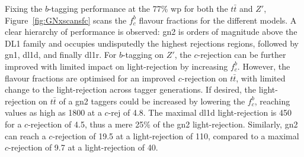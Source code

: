 Fixing the $b$-tagging performance at the 77\% \gls{wp} for both the $t\bar{t}$ and $Z'$, Figure~\ref{fig:GNxscansfc} scans the $f^b_c$ flavour fractions for the different models. A clear hierarchy of performance is observed: \gls{gn2} is orders of magnitude above the DL1 family and occupies undisputedly the highest rejections regions, followed by \gls{gn1}, \gls{dl1d}, and finally \gls{dl1r}. For $b$-tagging on $Z'$, the $c$-rejection can be further improved with limited impact on light-rejection by increasing $f^b_c$. However, the flavour fractions are optimised for an improved $c$-rejection on $t\bar{t}$, with limited change to the light-rejection across tagger generations. If desired, the light-rejection on $t\bar{t}$ of a \gls{gn2} taggers could be increased by lowering the $f^b_c$, reaching values as high as 1800 at a $c$-rej of 4.8. The maximal \gls{dl1d} light-rejection is 450 for a $c$-rejection of 4.5, thus a mere 25\% of the \gls{gn2} light-rejection. Similarly, \gls{gn2} can reach a $c$-rejection of 19.5 at a light-rejection of 110, compared to a maximal $c$-rejection of 9.7 at a light-rejection of 40. 

